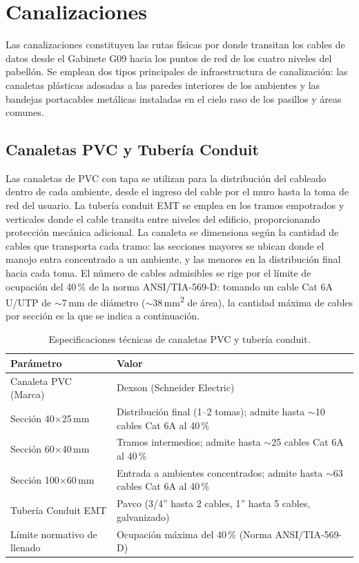 \section{Canalizaciones}
Las canalizaciones constituyen las rutas físicas por donde transitan los cables de datos desde el Gabinete G09 hacia los puntos de red de los cuatro niveles del pabellón. Se emplean dos tipos principales de infraestructura de canalización: las canaletas plásticas adosadas a las paredes interiores de los ambientes y las bandejas portacables metálicas instaladas en el cielo raso de los pasillos y áreas comunes.

\subsection{Canaletas PVC y Tubería Conduit}
Las canaletas de PVC con tapa se utilizan para la distribución del cableado dentro de cada ambiente, desde el ingreso del cable por el muro hasta la toma de red del usuario. La tubería conduit EMT se emplea en los tramos empotrados y verticales donde el cable transita entre niveles del edificio, proporcionando protección mecánica adicional.
La canaleta se dimensiona según la cantidad de cables que transporta cada tramo: las secciones mayores se ubican donde el manojo entra concentrado a un ambiente, y las menores en la distribución final hacia cada toma. El número de cables admisibles se rige por el límite de ocupación del 40\,\% de la norma ANSI/TIA-569-D: tomando un cable Cat 6A U/UTP de $\sim$7\,mm de diámetro ($\sim$38\,mm\textsuperscript{2} de área), la cantidad máxima de cables por sección es la que se indica a continuación.

\begin{table}[H]
\centering
\caption{Especificaciones técnicas de canaletas PVC y tubería conduit.}
\label{tab:spec_canaleta}
\begin{tabular}{lp{9cm}}
\hline
\textbf{Parámetro} & \textbf{Valor} \\
\hline
Canaleta PVC (Marca) & Dexson (Schneider Electric) \\
Sección 40$\times$25\,mm & Distribución final (1--2 tomas); admite hasta $\sim$10 cables Cat 6A al 40\,\% \\
Sección 60$\times$40\,mm & Tramos intermedios; admite hasta $\sim$25 cables Cat 6A al 40\,\% \\
Sección 100$\times$60\,mm & Entrada a ambientes concentrados; admite hasta $\sim$63 cables Cat 6A al 40\,\% \\
Tubería Conduit EMT & Pavco (3/4'' hasta 2 cables, 1'' hasta 5 cables, galvanizado) \\
Límite normativo de llenado & Ocupación máxima del 40\,\% (Norma ANSI/TIA-569-D) \\
\hline
\end{tabular}
\end{table}

